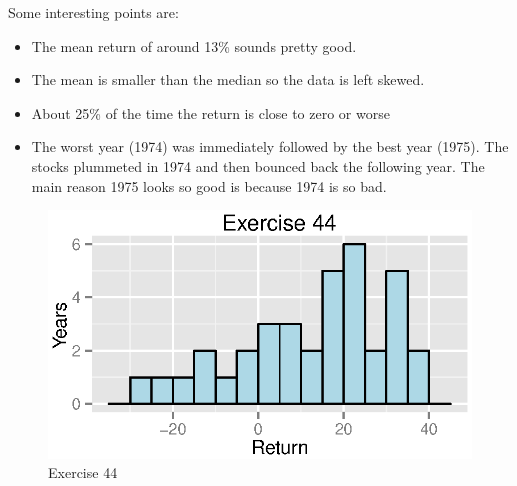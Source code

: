 \documentclass[letterpaper, landscape]{exam}
\begin{document}
\begin{description}
        Some interesting points are:
        \begin{itemize}
          \item The mean return of around 13\% sounds pretty good.
          \item The mean is smaller than the median so the data is left skewed.
          \item About 25\% of the time the return is close to zero or worse
          \item The worst year (1974) was immediately followed by the best year
            (1975).  The stocks plummeted in 1974 and then bounced back the following
            year.  The main reason 1975 looks so good is because 1974 is so bad.   
        \end{itemize}

        \begin{figure}[H]
          \centering
          \includegraphics{figures/ex44.eps}
          \caption{Exercise 44}
        \end{figure}



\end{description}
\end{document}

